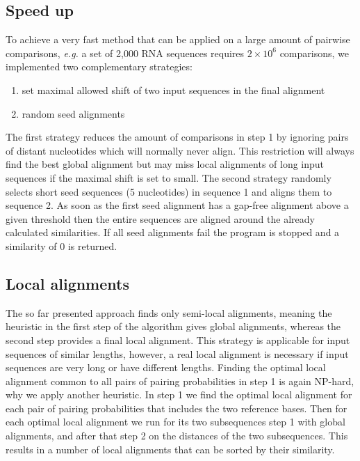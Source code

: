 \documentclass[a4paper,twoside]{article}
\newcommand\eg{\textit{e.g.}}
\begin{document}
\subsection{Speed up}

To achieve a very fast method that can be applied on a large amount of pairwise
comparisons, \eg{} a set of 2,000 RNA sequences requires $2 \times 10^6$
comparisons, we implemented two complementary strategies:
\begin{enumerate}
\item set maximal allowed shift of two input sequences in the final alignment
\item random seed alignments
\end{enumerate}
The first strategy reduces the amount of comparisons in step 1 by ignoring pairs
of distant nucleotides which will normally never align. This restriction will
always find the best global alignment but may miss local alignments of long
input sequences if the maximal shift is set to small. The second strategy
randomly selects short seed sequences (5 nucleotides) in sequence 1 and aligns
them to sequence 2. As soon as the first seed alignment has a gap-free alignment
above a given threshold then the entire sequences are aligned around the already
calculated similarities. If all seed alignments fail the program is stopped and
a similarity of 0 is returned.


\subsection{Local alignments}

The so far presented approach finds only semi-local alignments, meaning the
heuristic in the first step of the algorithm gives global alignments, whereas
the second step provides a final local alignment. This strategy is applicable
for input sequences of similar lengths, however, a real local alignment is
necessary if input sequences are very long or have different lengths. Finding
the optimal local alignment common to all pairs of pairing probabilities in step
1 is again NP-hard, why we apply another heuristic. In step 1 we find the
optimal local alignment for each pair of pairing probabilities that includes the
two reference bases. Then for each optimal local alignment we run for its two
subsequences step 1 with global alignments, and after that step 2 on the
distances of the two subsequences. This results in a number of local alignments
that can be sorted by their similarity.
\end{document}
